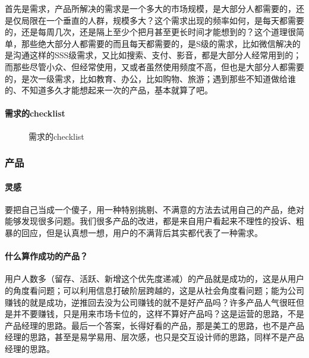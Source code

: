 \documentclass[letterpaper,11pt,english]{sphinxmanual}
\begin{document}
首先是需求，产品所解决的需求是一个多大的市场规模，是大部分人都需要的，还是仅局限在一个垂直的人群，规模多大？这个需求出现的频率如何，是每天都需要的，还是每周几次，还是隔上至少个把月甚至更长时间才能想到的？这个道理很简单，那些绝大部分人都需要的而且每天都需要的，是S级的需求，比如微信解决的是沟通这样的SSS级需求，又比如搜索、支付、影音，都是大部分人经常用到的；而那些尽管小众、但经常使用，又或者虽然使用频度不高，但也是大部分人都需要的，是次一级需求，比如教育、办公，比如购物、旅游；遇到那些不知道做给谁的、不知道多久才能想起来一次的产品，基本就算了吧。


\paragraph{需求的checklist}
\label{\detokenize{chapter_introduction/need:checklist}}
\begin{figure}[H]
\centering
\capstart

\noindent{}
\caption{需求的checklist}\label{\detokenize{chapter_introduction/need:id7}}\end{figure}


\subsubsection{产品}
\label{\detokenize{chapter_introduction/Product:id1}}\label{\detokenize{chapter_introduction/Product::doc}}

\paragraph{灵感}
\label{\detokenize{chapter_introduction/Product:id2}}
要把自己当成一个傻子，用一种特别挑剔、不满意的方法去试用自己的产品，绝对能够发现很多问题。我们很多产品的改进，都是来自用户看起来不理性的投诉、粗暴的回应，但是认真想一想，用户的不满背后其实都代表了一种需求。
%
\begin{footnote}[5]\sphinxAtStartFootnote
{}
%
\end{footnote}


\paragraph{什么算作成功的产品？}
\label{\detokenize{chapter_introduction/Product:id3}}
用户人数多（留存、活跃、新增这个优先度递减）的产品就是成功的，这是从用户的角度看问题；可以利用信息打破阶层跨越的，这是从社会角度看问题；能为公司赚钱的就是成功，逆推回去没为公司赚钱的就不是好产品吗？许多产品人气很旺但是并不要赚钱，只是用来市场卡位的，这样不算好产品吗？这是运营的思路，不是产品经理的思路。最后一个答案，长得好看的产品，那是美工的思路，也不是产品经理的思路，甚至是易学易用、层次感，也只是交互设计师的思路，同样不是产品经理的思路。
\end{document}
